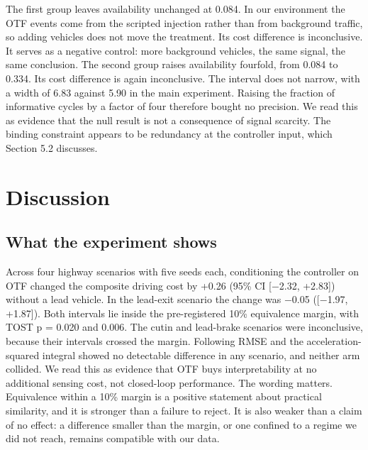 \documentclass[journal]{IEEEtran}
\begin{document}
The first group leaves availability unchanged at 0.084. In our environment the OTF events come from
the scripted injection rather than from background traffic, so adding vehicles does not move the
treatment. Its cost difference is inconclusive. It serves as a negative control: more background
vehicles, the same signal, the same conclusion.
The second group raises availability fourfold, from 0.084 to 0.334. Its cost difference is again
inconclusive. The interval does not narrow, with a width of 6.83 against 5.90 in the main experiment.
Raising the fraction of informative cycles by a factor of four therefore bought no precision.
We read this as evidence that the null result is not a consequence of signal scarcity. The binding
constraint appears to be redundancy at the controller input, which Section 5.2 discusses.
\section*{Discussion}
\subsection{What the experiment shows}
Across four highway scenarios with five seeds each, conditioning the controller on OTF changed the
composite driving cost by +0.26 (95\% CI [$-$2.32, +2.83]) without a lead vehicle. In the lead-exit
scenario the change was $-$0.05 ([$-$1.97, +1.87]). Both intervals lie inside the pre-registered 10\%
equivalence margin, with TOST p = 0.020 and 0.006. The cutin and lead-brake scenarios were
inconclusive, because their intervals crossed the margin. Following RMSE and the acceleration-squared
integral showed no detectable difference in any scenario, and neither arm collided.
We read this as evidence that OTF buys interpretability at no additional sensing cost, not closed-loop
performance. The wording matters. Equivalence within a 10\%
margin is a positive statement about practical similarity, and it is stronger than a failure to
reject. It is also weaker than a claim of no effect: a difference smaller than the margin, or one
confined to a regime we did not reach, remains compatible with our data.
\end{document}
